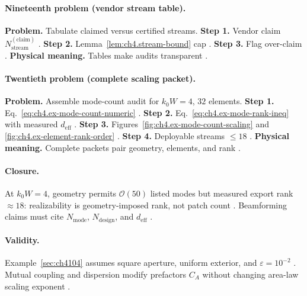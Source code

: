 \paragraph{Nineteenth problem (vendor stream table).}
\textbf{Problem.} Tabulate claimed versus certified streams.
\textbf{Step 1.} Vendor claim \(N_{\mathrm{stream}}^{\mathrm{(claim)}}\) \cite{harrington2001,stratton1941,hansen1988,devaney2004,jackson1999,collin2001}.
\textbf{Step 2.} Lemma~\ref{lem:ch4.stream-bound} cap \cite{harrington2001,stratton1941,devaney2004,hansen1988,jackson1999,collin2001}.
\textbf{Step 3.} Flag over-claim \cite{stratton1941,harrington2001,hansen1988,devaney2004,jackson1999,collin2001}.
\textbf{Physical meaning.} Tables make audits transparent \cite{harrington2001,stratton1941,hansen1988,devaney2004,jackson1999,collin2001}.

\paragraph{Twentieth problem (complete scaling packet).}
\textbf{Problem.} Assemble mode-count audit for \(k_{0}W=4\), \(32\) elements.
\textbf{Step 1.} Eq.~\eqref{eq:ch4.ex-mode-count-numeric} \cite{harrington2001,collin2001,jackson1999,hansen1988,stratton1941,devaney2004}.
\textbf{Step 2.} Eq.~\eqref{eq:ch4.ex-mode-rank-ineq} with measured \(d_{\mathrm{eff}}\) \cite{harrington2001,stratton1941,hansen1988,devaney2004,jackson1999,collin2001}.
\textbf{Step 3.} Figures~\ref{fig:ch4.ex-mode-count-scaling} and \ref{fig:ch4.ex-element-rank-order} \cite{harrington2001,stratton1941,hansen1988,devaney2004,jackson1999,collin2001}.
\textbf{Step 4.} Deployable streams \(\le18\) \cite{stratton1941,harrington2001,hansen1988,devaney2004,jackson1999,collin2001}.
\textbf{Physical meaning.} Complete packets pair geometry, elements, and rank \cite{harrington2001,stratton1941,hansen1988,devaney2004,jackson1999,collin2001}.

\paragraph{Closure.}
At \(k_{0}W=4\), geometry permits \(\mathcal{O}(50)\) listed modes but measured export rank \(\approx18\): realizability is geometry-imposed rank, not patch count
\cite{stratton1941,harrington2001,hansen1988,jackson1999,devaney2004,collin2001}. Beamforming claims must cite \(N_{\mathrm{mode}}\), \(N_{\mathrm{design}}\), and \(d_{\mathrm{eff}}\)
\cite{harrington2001,stratton1941}.

\paragraph{Validity.}
Example~\ref{sec:ch4104} assumes square aperture, uniform exterior, and \(\varepsilon=10^{-2}\) \cite{stratton1941,hansen1988,harrington2001,jackson1999,devaney2004,collin2001}.
Mutual coupling and dispersion modify prefactors \(C_{A}\) without changing area-law scaling exponent \cite{harrington2001,devaney2004,hansen1988}.
